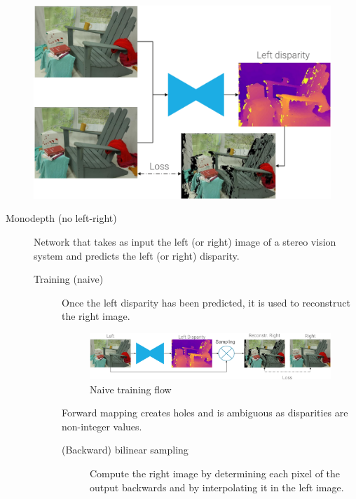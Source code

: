 \begin{description}
\begin{description}
                \begin{figure}[H]
                    \centering
                    \includegraphics[width=0.45\linewidth]{./img/_stereo_pipeline_reconstruction.pdf}
                \end{figure}
        \end{description}
\end{description}

\begin{description}
    \item[Monodepth (no left-right)] 
        Network that takes as input the left (or right) image of a stereo vision system and predicts the left (or right) disparity.

        \begin{description}
            \item[Training (naive)] 
                Once the left disparity has been predicted, it is used to reconstruct the right image.

                \begin{figure}[H]
                    \centering
                    \includegraphics[width=0.8\linewidth]{./img/_monodepth_naive.pdf}
                    \caption{Naive training flow}
                \end{figure}

                \begin{remark}
                    Forward mapping creates holes and is ambiguous as disparities are non-integer values.
                \end{remark}

                \begin{description}
                    \item[(Backward) bilinear sampling] 
                        Compute the right image by determining each pixel of the output backwards and by interpolating it in the left image.


\end{description}
\end{description}
\end{description}
